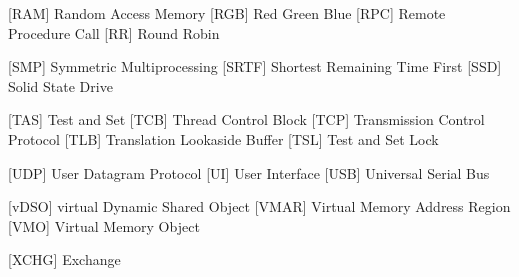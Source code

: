 \begin{acronym} [POSIX]

  [RAM] {Random Access Memory}
 [RGB] {Red Green Blue}
 [RPC] {Remote Procedure Call}
 [RR] {Round Robin}

 [SMP] {Symmetric Multiprocessing}
 [SRTF] {Shortest Remaining Time First}
 [SSD] {Solid State Drive}

 [TAS] {Test and Set}
 [TCB] {Thread Control Block}
 [TCP] {Transmission Control Protocol}
 [TLB] {Translation Lookaside Buffer}
 [TSL] {Test and Set Lock}

 [UDP] {User Datagram Protocol} 
  [UI]  {User Interface}
 [USB] {Universal Serial Bus}

 [vDSO] {virtual Dynamic Shared Object}
 [VMAR] {Virtual Memory Address Region}
  [VMO]  {Virtual Memory Object}


 [XCHG] {Exchange}



\end{acronym} 
